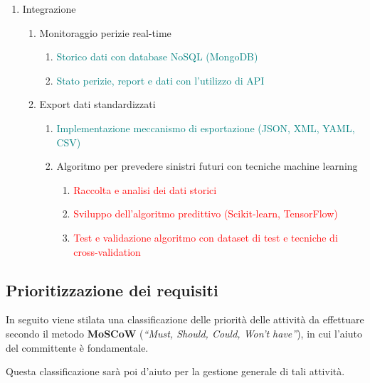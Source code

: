 \documentclass[a4paper,12pt, openright]{report}
\begin{document}
\begin{enumerate}
\begin{enumerate}
    \end{enumerate}
    \item Integrazione
    \begin{enumerate}
        \item Monitoraggio perizie real-time
        \begin{enumerate}
            \item \textcolor{teal}{Storico dati con database NoSQL (MongoDB)}
            \item \textcolor{teal}{Stato perizie, report e dati con l'utilizzo di API}
        \end{enumerate}
        \item Export dati standardizzati
        \begin{enumerate}
            \item \textcolor{teal}{Implementazione meccanismo di esportazione (JSON, XML, YAML, CSV)}
            \item Algoritmo per prevedere sinistri futuri con tecniche machine learning
            \begin{enumerate}
                \item \textcolor{red}{Raccolta e analisi dei dati storici}
                \item \textcolor{red}{Sviluppo dell'algoritmo predittivo (Scikit-learn, TensorFlow)}
                \item \textcolor{red}{Test e validazione algoritmo con dataset di test e tecniche di cross-validation}
            \end{enumerate}
        \end{enumerate}
    \end{enumerate}
\end{enumerate}

\subsection{Prioritizzazione dei requisiti}
\label{prioritizzazione}
In seguito viene stilata una classificazione delle priorità delle attività da effettuare secondo il metodo \textbf{MoSCoW} (\textit{``Must, Should, Could, Won’t have''}), in cui l'aiuto del committente è fondamentale.

Questa classificazione sarà poi d'aiuto per la gestione generale di tali attività.
\end{document}
